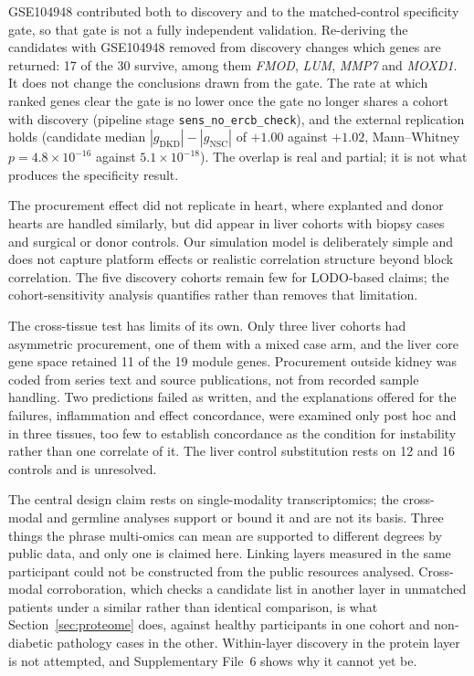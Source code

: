 \documentclass[11pt]{article}
\begin{document}
GSE104948 contributed both to discovery and to the matched-control specificity gate, so that gate is not a fully independent validation. Re-deriving the candidates with GSE104948 removed from discovery changes which genes are returned: 17 of the 30 survive, among them \textit{FMOD}, \textit{LUM}, \textit{MMP7} and \textit{MOXD1}. It does not change the conclusions drawn from the gate. The rate at which ranked genes clear the gate is no lower once the gate no longer shares a cohort with discovery (pipeline stage \texttt{sens\_no\_ercb\_check}), and the external replication holds (candidate median $|g_{\text{DKD}}| - |g_{\text{NSC}}|$ of $+1.00$ against $+1.02$, Mann--Whitney $p = 4.8 \times 10^{-16}$ against $5.1 \times 10^{-18}$). The overlap is real and partial; it is not what produces the specificity result.

The procurement effect did not replicate in heart, where explanted and donor hearts are handled similarly, but did appear in liver cohorts with biopsy cases and surgical or donor controls. Our simulation model is deliberately simple and does not capture
platform effects or realistic correlation structure beyond block correlation. The five discovery
cohorts remain few for LODO-based claims; the cohort-sensitivity analysis quantifies rather than
removes that limitation.

The cross-tissue test has limits of its own. Only three liver cohorts had asymmetric procurement,
one of them with a mixed case arm, and the liver core gene space retained 11 of the 19 module
genes. Procurement outside kidney was coded from series text and source publications, not from
recorded sample handling. Two predictions failed as written, and the explanations offered for
the failures, inflammation and effect concordance, were examined only post hoc and in three
tissues, too few to establish concordance as the condition for instability rather than one
correlate of it. The liver control substitution rests on 12 and 16 controls and is unresolved.

The central design claim rests on single-modality transcriptomics; the cross-modal and germline analyses support or bound it and are not its basis. Three things the phrase multi-omics can mean are supported to different degrees by public data, and only one is claimed here. Linking layers measured in the same participant could not be constructed from the public resources analysed. Cross-modal corroboration, which checks a candidate list in another layer in unmatched patients under a similar rather than identical comparison, is what Section~\ref{sec:proteome} does, against healthy participants in one cohort and non-diabetic pathology cases in the other. Within-layer discovery in the protein layer is not attempted, and Supplementary File~6 shows why it cannot yet be.
\end{document}
